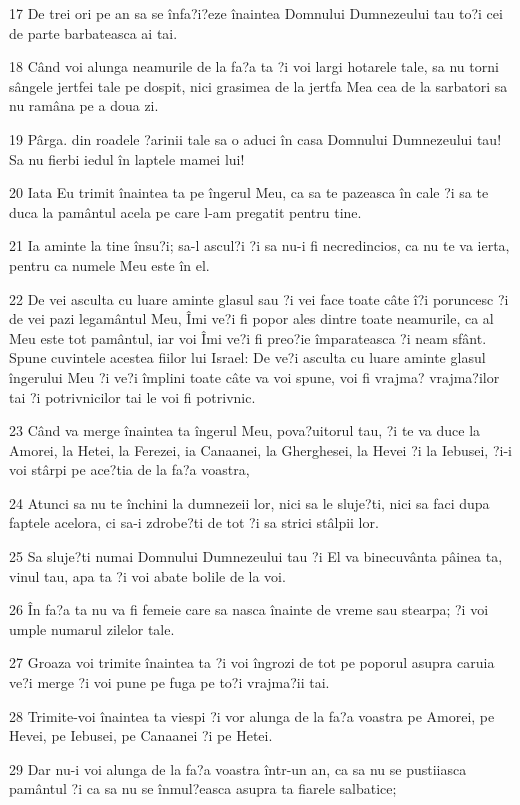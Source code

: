 \par 17 De trei ori pe an sa se înfa?i?eze înaintea Domnului Dumnezeului tau to?i cei de parte barbateasca ai tai.
\par 18 Când voi alunga neamurile de la fa?a ta ?i voi largi hotarele tale, sa nu torni sângele jertfei tale pe dospit, nici grasimea de la jertfa Mea cea de la sarbatori sa nu ramâna pe a doua zi.
\par 19 Pârga. din roadele ?arinii tale sa o aduci în casa Domnului Dumnezeului tau! Sa nu fierbi iedul în laptele mamei lui!
\par 20 Iata Eu trimit înaintea ta pe îngerul Meu, ca sa te pazeasca în cale ?i sa te duca la pamântul acela pe care l-am pregatit pentru tine.
\par 21 Ia aminte la tine însu?i; sa-l ascul?i ?i sa nu-i fi necredincios, ca nu te va ierta, pentru ca numele Meu este în el.
\par 22 De vei asculta cu luare aminte glasul sau ?i vei face toate câte î?i poruncesc ?i de vei pazi legamântul Meu, Îmi ve?i fi popor ales dintre toate neamurile, ca al Meu este tot pamântul, iar voi Îmi ve?i fi preo?ie împarateasca ?i neam sfânt. Spune cuvintele acestea fiilor lui Israel: De ve?i asculta cu luare aminte glasul îngerului Meu ?i ve?i împlini toate câte va voi spune, voi fi vrajma? vrajma?ilor tai ?i potrivnicilor tai le voi fi potrivnic.
\par 23 Când va merge înaintea ta îngerul Meu, pova?uitorul tau, ?i te va duce la Amorei, la Hetei, la Ferezei, ia Canaanei, la Gherghesei, la Hevei ?i la Iebusei, ?i-i voi stârpi pe ace?tia de la fa?a voastra,
\par 24 Atunci sa nu te închini la dumnezeii lor, nici sa le sluje?ti, nici sa faci dupa faptele acelora, ci sa-i zdrobe?ti de tot ?i sa strici stâlpii lor.
\par 25 Sa sluje?ti numai Domnului Dumnezeului tau ?i El va binecuvânta pâinea ta, vinul tau, apa ta ?i voi abate bolile de la voi.
\par 26 În fa?a ta nu va fi femeie care sa nasca înainte de vreme sau stearpa; ?i voi umple numarul zilelor tale.
\par 27 Groaza voi trimite înaintea ta ?i voi îngrozi de tot pe poporul asupra caruia ve?i merge ?i voi pune pe fuga pe to?i vrajma?ii tai.
\par 28 Trimite-voi înaintea ta viespi ?i vor alunga de la fa?a voastra pe Amorei, pe Hevei, pe Iebusei, pe Canaanei ?i pe Hetei.
\par 29 Dar nu-i voi alunga de la fa?a voastra într-un an, ca sa nu se pustiiasca pamântul ?i ca sa nu se înmul?easca asupra ta fiarele salbatice;
